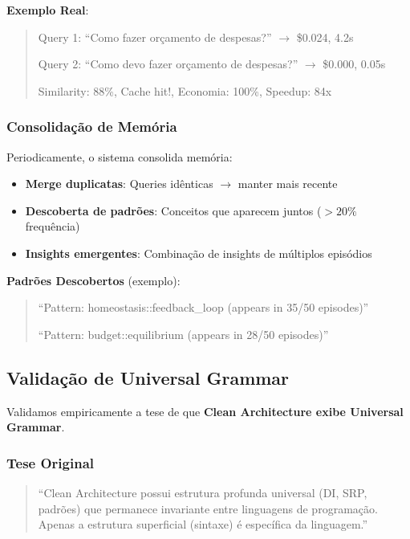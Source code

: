 \documentclass[11pt]{article}
\begin{document}
\textbf{Exemplo Real}:
\begin{quote}
Query 1: ``Como fazer orçamento de despesas?'' $\rightarrow$ \$0.024, 4.2s

Query 2: ``Como devo fazer orçamento de despesas?'' $\rightarrow$ \$0.000, 0.05s

Similarity: 88\%, Cache hit!, Economia: 100\%, Speedup: 84x
\end{quote}

\subsubsection{Consolidação de Memória}

Periodicamente, o sistema consolida memória:

\begin{itemize}
    \item \textbf{Merge duplicatas}: Queries idênticas $\rightarrow$ manter mais recente
    \item \textbf{Descoberta de padrões}: Conceitos que aparecem juntos ($>20\%$ frequência)
    \item \textbf{Insights emergentes}: Combinação de insights de múltiplos episódios
\end{itemize}

\textbf{Padrões Descobertos} (exemplo):
\begin{quote}
``Pattern: homeostasis::feedback\_loop (appears in 35/50 episodes)''

``Pattern: budget::equilibrium (appears in 28/50 episodes)''
\end{quote}

\subsection{Validação de Universal Grammar}

Validamos empiricamente a tese de que \textbf{Clean Architecture exibe Universal Grammar}.

\subsubsection{Tese Original}

\begin{quote}
``Clean Architecture possui estrutura profunda universal (DI, SRP, padrões) que permanece invariante entre linguagens de programação. Apenas a estrutura superficial (sintaxe) é específica da linguagem.''
\end{quote}
\end{document}

